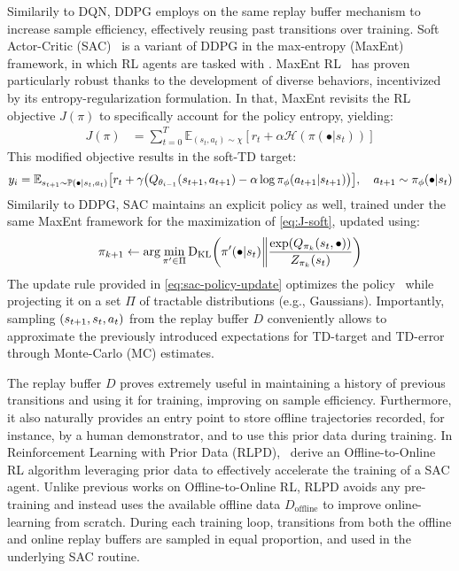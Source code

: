 Similarily to DQN, DDPG employs on the same replay buffer mechanism to increase sample efficiency, effectively reusing past transitions over training.
Soft Actor-Critic (SAC)~\citep{haarnojaSoftActorCriticOffPolicy2018} is a variant of DDPG in the max-entropy (MaxEnt) framework, in which RL agents are tasked with .
MaxEnt RL~\citep{haarnojaReinforcementLearningDeep2017} has proven particularly robust thanks to the development of diverse behaviors, incentivized by its entropy-regularization formulation.
In that, MaxEnt revisits the RL objective \( J (\pi) \) to specifically account for the policy entropy, yielding:
\begin{align}
    J(\pi) &= \sum_{t=0}^T \mathbb{E}_{(s_t, a_t) \sim \chi} \left[ r_t + \alpha \mathcal H(\pi (\bullet \vert s_t)) \right] \label{eq:J-soft}
\end{align}
This modified objective results in the soft-TD target:
\begin{equation}\label{eq:soft-td-target}
    y_i = \mathbb E_{s_{t+1} \sim \mathbb P( \bullet \vert s_t, a_t)} \left[ r_t + \gamma \left( Q_{\theta_{i-1}} (\stateplusone, a_{t+1}) - \alpha \log \pi_\phi(a_{t+1} \vert \stateplusone) \right) \right], \quad a_{t+1} \sim \pi_\phi(\bullet \vert s_t)
\end{equation}
Similarily to DDPG, SAC maintains an explicit policy as well, trained under the same MaxEnt framework for the maximization of \ref{eq:J-soft}, updated using:
\begin{equation}\label{eq:sac-policy-update}
    \pi_{k+1} \leftarrow \arg\min_{\pi^\prime \in \Pi} \text{D}_{\text{KL}} \left(\pi^\prime (\bullet \vert \state) \bigg\Vert \frac{\exp(Q_{\pi_k}(s_t, \bullet))}{Z_{\pi_k}(s_t)} \right)
\end{equation}
The update rule provided in \ref{eq:sac-policy-update} optimizes the policy~\citep{haarnojaReinforcementLearningDeep2017} while projecting it on a set \( \Pi \) of tractable distributions (e.g., Gaussians).
Importantly, sampling \( (s_{t+1}, s_t, a_t) \) from the replay buffer \( D \) conveniently allows to approximate the previously introduced expectations for TD-target and TD-error through Monte-Carlo (MC) estimates.

The replay buffer \( D \) proves extremely useful in maintaining a history of previous transitions and using it for training, improving on sample efficiency.
Furthermore, it also naturally provides an entry point to store offline trajectories recorded, for instance, by a human demonstrator, and to use this prior data during training.
In Reinforcement Learning with Prior Data (RLPD),~\citet{ballEfficientOnlineReinforcement2023} derive an Offline-to-Online RL algorithm leveraging prior data to effectively accelerate the training of a SAC agent.
Unlike previous works on Offline-to-Online RL, RLPD avoids any pre-training and instead uses the available offline data \( D_\text{offline} \) to improve online-learning from scratch.
During each training loop, transitions from both the offline and online replay buffers are sampled in equal proportion, and used in the underlying SAC routine.

